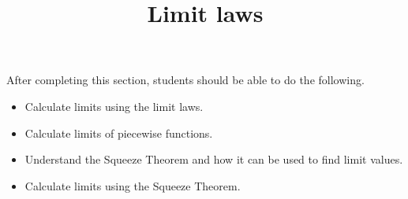\documentclass{ximera}
\title{Limit laws}
\begin{document}
\begin{abstract}
\end{abstract}

\maketitle

\begin{sectionOutcomes}
After completing this section, students should be able to do the following.

\begin{itemize}
	\item Calculate limits using the limit laws.
	\item Calculate limits of piecewise functions.
	\item Understand the Squeeze Theorem and how it can be used to find limit values.
	\item Calculate limits using the Squeeze Theorem.
\end{itemize}
\end{sectionOutcomes}
\end{document}
